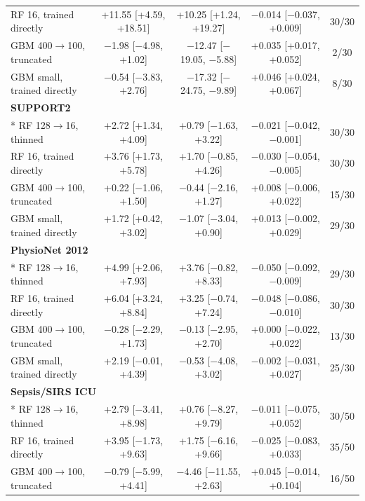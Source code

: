 {\begin{longtable}{lcccc}
\quad RF 16, trained directly & +11.55 [+4.59, +18.51] & +10.25 [+1.24, +19.27] & $-$0.014 [$-$0.037, +0.009] & 30/30 \\
\quad GBM 400$\rightarrow$100, truncated & $-$1.98 [$-$4.98, +1.02] & $-$12.47 [$-$19.05, $-$5.88] & +0.035 [+0.017, +0.052] & 2/30 \\
\quad GBM small, trained directly & $-$0.54 [$-$3.83, +2.76] & $-$17.32 [$-$24.75, $-$9.89] & +0.046 [+0.024, +0.067] & 8/30 \\
\midrule
\multicolumn{5}{l}{\textbf{SUPPORT2}} \\*
\quad RF 128$\rightarrow$16, thinned & +2.72 [+1.34, +4.09] & +0.79 [$-$1.63, +3.22] & $-$0.021 [$-$0.042, $-$0.001] & 30/30 \\
\quad RF 16, trained directly & +3.76 [+1.73, +5.78] & +1.70 [$-$0.85, +4.26] & $-$0.030 [$-$0.054, $-$0.005] & 30/30 \\
\quad GBM 400$\rightarrow$100, truncated & +0.22 [$-$1.06, +1.50] & $-$0.44 [$-$2.16, +1.27] & +0.008 [$-$0.006, +0.022] & 15/30 \\
\quad GBM small, trained directly & +1.72 [+0.42, +3.02] & $-$1.07 [$-$3.04, +0.90] & +0.013 [$-$0.002, +0.029] & 29/30 \\
\midrule
\multicolumn{5}{l}{\textbf{PhysioNet 2012}} \\*
\quad RF 128$\rightarrow$16, thinned & +4.99 [+2.06, +7.93] & +3.76 [$-$0.82, +8.33] & $-$0.050 [$-$0.092, $-$0.009] & 29/30 \\
\quad RF 16, trained directly & +6.04 [+3.24, +8.84] & +3.25 [$-$0.74, +7.24] & $-$0.048 [$-$0.086, $-$0.010] & 30/30 \\
\quad GBM 400$\rightarrow$100, truncated & $-$0.28 [$-$2.29, +1.73] & $-$0.13 [$-$2.95, +2.70] & +0.000 [$-$0.022, +0.022] & 13/30 \\
\quad GBM small, trained directly & +2.19 [$-$0.01, +4.39] & $-$0.53 [$-$4.08, +3.02] & $-$0.002 [$-$0.031, +0.027] & 25/30 \\
\midrule
\multicolumn{5}{l}{\textbf{Sepsis/SIRS ICU}} \\*
\quad RF 128$\rightarrow$16, thinned & +2.79 [$-$3.41, +8.98] & +0.76 [$-$8.27, +9.79] & $-$0.011 [$-$0.075, +0.052] & 30/50 \\
\quad RF 16, trained directly & +3.95 [$-$1.73, +9.63] & +1.75 [$-$6.16, +9.66] & $-$0.025 [$-$0.083, +0.033] & 35/50 \\
\quad GBM 400$\rightarrow$100, truncated & $-$0.79 [$-$5.99, +4.41] & $-$4.46 [$-$11.55, +2.63] & +0.045 [$-$0.014, +0.104] & 16/50 \\

\end{longtable}}
